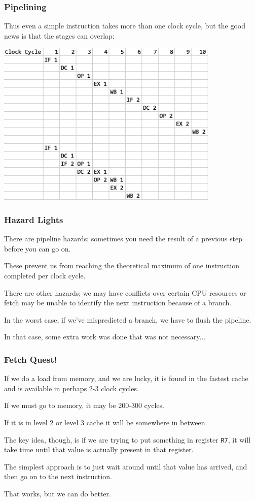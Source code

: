 \begin{frame}
\frametitle{Pipelining}

Thus even a simple instruction takes more than one clock cycle, but the good news is that the stages can overlap:

\begin{center}
\includegraphics[width=0.8\textwidth]{images/pipelining}
\end{center}

\end{frame}


\begin{frame}
\frametitle{Hazard Lights}

There are pipeline hazards: sometimes you need the result of a previous step before you can go on. 

These prevent us from reaching the theoretical maximum of one instruction completed per clock cycle. 

There are other hazards; we may have conflicts over certain CPU resources or fetch may be unable to identify the next instruction because of a branch. 

In the worst case, if we've mispredicted a branch, we have to flush the pipeline. 

In that case, some extra work was done that was not necessary... 

\end{frame}



\begin{frame}
\frametitle{Fetch Quest!}

If we do a load from memory, and we are lucky, it is found in the fastest cache and is available in perhaps 2-3 clock cycles. 

If we must go to memory, it may be 200-300 cycles. 

If it is in level 2 or level 3 cache it will be somewhere in between. 

The key idea, though, is if we are trying to put something in register \texttt{R7}, it will take time until that value is actually present in that register. 

The simplest approach is to just wait around until that value has arrived, and then go on to the next instruction. 

That works, but we can do better.

\end{frame}



